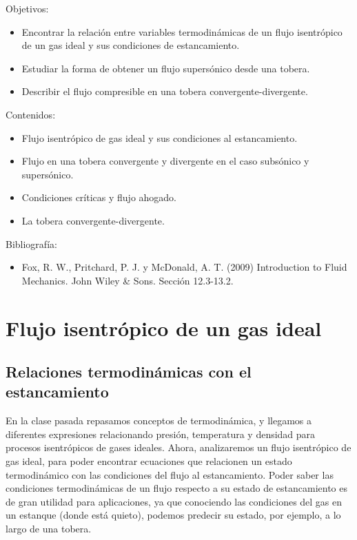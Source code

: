 \begin{framed}

Objetivos:
\begin{itemize}
    \item Encontrar la relación entre variables termodinámicas de un flujo isentrópico de un gas ideal y sus condiciones de estancamiento.
    \item Estudiar la forma de obtener un flujo supersónico desde una tobera.
    \item Describir el flujo compresible en una tobera convergente-divergente.
\end{itemize}

Contenidos:
\begin{itemize}
    \item Flujo isentrópico de gas ideal y sus condiciones al estancamiento. 
    \item Flujo en una tobera convergente y divergente en el caso subsónico y supersónico. 
    \item Condiciones críticas y flujo ahogado.
    \item La tobera convergente-divergente.
\end{itemize}

Bibliografía:
\begin{itemize}
    \item Fox, R. W., Pritchard, P. J. y McDonald, A. T. (2009) Introduction to Fluid Mechanics. John Wiley \& Sons. Sección 12.3-13.2.
\end{itemize}
\end{framed}

\section*{Flujo isentrópico de un gas ideal}
\subsection*{Relaciones termodinámicas con el estancamiento}

En la clase pasada repasamos conceptos de termodinámica, y llegamos a diferentes expresiones relacionando presión, temperatura y densidad para procesos isentrópicos de gases ideales. 
Ahora, analizaremos un flujo isentrópico de gas ideal, para poder encontrar ecuaciones que relacionen un estado termodinámico con las condiciones del flujo al estancamiento.
Poder saber las condiciones termodinámicas de un flujo respecto a su estado de estancamiento es de gran utilidad para aplicaciones, ya que conociendo las condiciones del gas en un estanque (donde está quieto), podemos predecir su estado, por ejemplo, a lo largo de una tobera.

